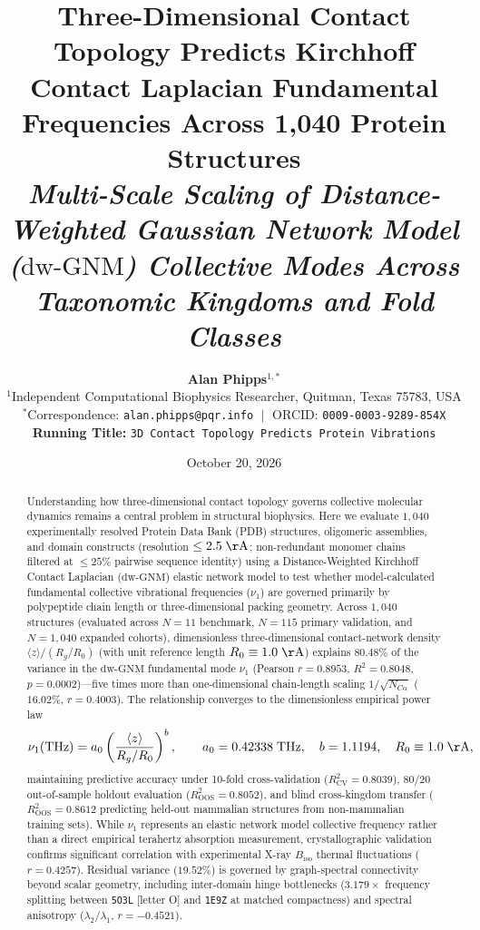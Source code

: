 \documentclass[11pt,onecolumn,letterpaper]{article}
\title{\textbf{Three-Dimensional Contact Topology Predicts Kirchhoff Contact Laplacian Fundamental Frequencies Across 1,040 Protein Structures}\\[6pt]
\large \textit{Multi-Scale Scaling of Distance-Weighted Gaussian Network Model ($\mathrm{dw\text{-}GNM}$) Collective Modes Across Taxonomic Kingdoms and Fold Classes}}
\author{\textbf{Alan Phipps}$^{1,*}$\\[4pt]
\small $^{1}$Independent Computational Biophysics Researcher, Quitman, Texas 75783, USA\\
\small $^{*}$Correspondence: \texttt{alan.phipps@pqr.info} $\;\vert\;$ ORCID: \texttt{0009-0003-9289-854X}\\
\small \textbf{Running Title:} \texttt{3D Contact Topology Predicts Protein Vibrations}}
\date{October 20, 2026}
\begin{document}
\maketitle

\begin{abstract}
\noindent Understanding how three-dimensional contact topology governs collective molecular dynamics remains a central problem in structural biophysics. Here we evaluate $1,040$ experimentally resolved Protein Data Bank (PDB) structures, oligomeric assemblies, and domain constructs (resolution $\le 2.5\;\mathrm{\AA}$; non-redundant monomer chains filtered at $\le 25\%$ pairwise sequence identity) using a Distance-Weighted Kirchhoff Contact Laplacian ($\mathrm{dw\text{-}GNM}$) elastic network model to test whether model-calculated fundamental collective vibrational frequencies ($\nu_1$) are governed primarily by polypeptide chain length or three-dimensional packing geometry. Across $1,040$ structures (evaluated across $N = 11$ benchmark, $N = 115$ primary validation, and $N = 1,040$ expanded cohorts), dimensionless three-dimensional contact-network density $\langle z \rangle / (R_g / R_0)$ (with unit reference length $R_0 \equiv 1.0\;\mathrm{\AA}$) explains $80.48\%$ of the variance in the $\mathrm{dw\text{-}GNM}$ fundamental mode $\nu_1$ (Pearson $r = 0.8953$, $R^2 = 0.8048$, $p = 0.0002$)---five times more than one-dimensional chain-length scaling $1/\sqrt{N_{C\alpha}}$ ($16.02\%$, $r = 0.4003$). The relationship converges to the dimensionless empirical power law
$$\nu_1(\mathrm{THz}) = a_0 \left( \frac{\langle z \rangle}{R_g / R_0} \right)^{b}, \qquad a_0 = 0.42338\;\mathrm{THz}, \quad b = 1.1194, \quad R_0 \equiv 1.0\;\mathrm{\AA},$$
maintaining predictive accuracy under 10-fold cross-validation ($R^2_{\mathrm{CV}} = 0.8039$), 80/20 out-of-sample holdout evaluation ($R^2_{\mathrm{OOS}} = 0.8052$), and blind cross-kingdom transfer ($R^2_{\mathrm{OOS}} = 0.8612$ predicting held-out mammalian structures from non-mammalian training sets). While $\nu_1$ represents an elastic network model collective frequency rather than a direct empirical terahertz absorption measurement, crystallographic validation confirms significant correlation with experimental X-ray $B_{\mathrm{iso}}$ thermal fluctuations ($r = 0.4257$). Residual variance ($19.52\%$) is governed by graph-spectral connectivity beyond scalar geometry, including inter-domain hinge bottlenecks ($3.179\times$ frequency splitting between \texttt{5O3L} [letter O] and \texttt{1E9Z} at matched compactness) and spectral anisotropy ($\lambda_2 / \lambda_1$, $r = -0.4521$).
\end{abstract}
\end{document}
